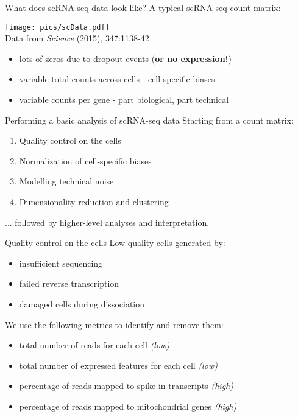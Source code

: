 \documentclass{beamer}
\begin{document}
\begin{frame}{What does scRNA-seq data look like?}
A typical scRNA-seq count matrix:
\begin{center}
    \texttt{[image: pics/scData.pdf]} \\
    \vspace{-.1in}
    {\tiny Data from \textit{Science} (2015), 347:1138-42}
\end{center}
\begin{itemize}
    \item lots of zeros due to dropout events (\textbf{or no expression!})
    \item variable total counts across cells - cell-specific biases
    \item variable counts per gene - part biological, part technical
\end{itemize}
\end{frame}

\begin{frame}{Performing a basic analysis of scRNA-seq data}
    Starting from a count matrix:\\[0.1em]
    \begin{enumerate}
        \setlength\itemsep{0.5em}
        \item Quality control on the cells
        \item Normalization of cell-specific biases
        \item Modelling technical noise 
        \item Dimensionality reduction and clustering
    \end{enumerate}
    ... followed by higher-level analyses and interpretation.
\end{frame}

\begin{frame}{Quality control on the cells}
    Low-quality cells generated by:
    \begin{itemize}
        \item insufficient sequencing
        \item failed reverse transcription
        \item damaged cells during dissociation
    \end{itemize}
    \vspace{0.1in}
    We use the following metrics to identify and remove them:
    \begin{itemize}
        \item total number of reads for each cell \textit{(low)}
        \item total number of expressed features for each cell \textit{(low)}
        \item percentage of reads mapped to spike-in transcripts \textit{(high)}
        \item percentage of reads mapped to mitochondrial genes \textit{(high)}
    \end{itemize}
\end{frame}
   
\end{document}
